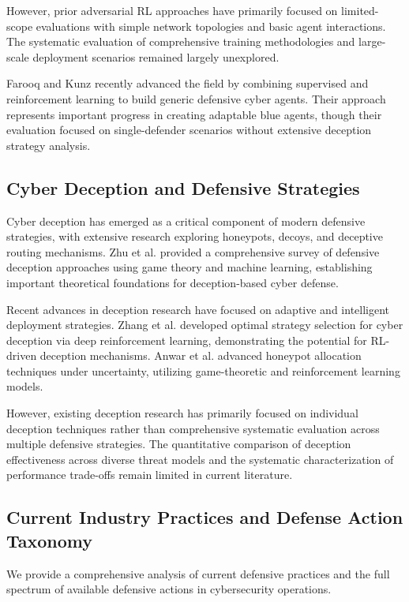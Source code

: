 \documentclass[12pt,oneside]{article}
\begin{document}
However, prior adversarial RL approaches have primarily focused on limited-scope evaluations with simple network topologies and basic agent interactions. The systematic evaluation of comprehensive training methodologies and large-scale deployment scenarios remained largely unexplored.

Farooq and Kunz \cite{farooq2025combining} recently advanced the field by combining supervised and reinforcement learning to build generic defensive cyber agents. Their approach represents important progress in creating adaptable blue agents, though their evaluation focused on single-defender scenarios without extensive deception strategy analysis.

\subsection{Cyber Deception and Defensive Strategies}

Cyber deception has emerged as a critical component of modern defensive strategies, with extensive research exploring honeypots, decoys, and deceptive routing mechanisms. Zhu et al. \cite{zhu2021survey} provided a comprehensive survey of defensive deception approaches using game theory and machine learning, establishing important theoretical foundations for deception-based cyber defense.

Recent advances in deception research have focused on adaptive and intelligent deployment strategies. Zhang et al. \cite{zhang2022optimal} developed optimal strategy selection for cyber deception via deep reinforcement learning, demonstrating the potential for RL-driven deception mechanisms. Anwar et al. \cite{anwar2022honeypot} advanced honeypot allocation techniques under uncertainty, utilizing game-theoretic and reinforcement learning models.

However, existing deception research has primarily focused on individual deception techniques rather than comprehensive systematic evaluation across multiple defensive strategies. The quantitative comparison of deception effectiveness across diverse threat models and the systematic characterization of performance trade-offs remain limited in current literature.

\subsection{Current Industry Practices and Defense Action Taxonomy}

We provide a comprehensive analysis of current defensive practices and the full spectrum of available defensive actions in cybersecurity operations.
\end{document}
